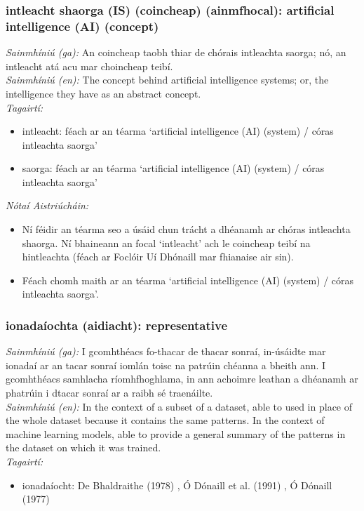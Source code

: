 \documentclass{article}
\begin{document}
\subsubsection*{intleacht shaorga (IS) (coincheap) (ainmfhocal): artificial intelligence (AI) (concept)}
 \noindent \textit{Sainmhíniú (ga):} An coincheap taobh thiar de chórais intleachta saorga; nó, an intleacht atá acu mar choincheap teibí.
\\
 \noindent \textit{Sainmhíniú (en):} The concept behind artificial intelligence systems; or, the intelligence they have as an abstract concept.
\\
 \noindent \textit{Tagairtí:}
\begin{itemize}
	\item intleacht: féach ar an téarma `artificial intelligence (AI) (system) / córas intleachta saorga'
	\item saorga: féach ar an téarma `artificial intelligence (AI) (system) / córas intleachta saorga'
\end{itemize}

 \noindent \textit{Nótaí Aistriúcháin:}
\begin{itemize}
	\item Ní féidir an téarma seo a úsáid chun trácht a dhéanamh ar chóras intleachta shaorga. Ní bhaineann an focal `intleacht' ach le coincheap teibí na hintleachta (féach ar Foclóir Uí Dhónaill mar fhianaise air sin).
	\item Féach chomh maith ar an téarma `artificial intelligence (AI) (system) / córas intleachta saorga'.
\end{itemize}


\subsubsection*{ionadaíochta (aidiacht): representative}
 \noindent \textit{Sainmhíniú (ga):} I gcomhthéacs fo-thacar de thacar sonraí, in-úsáidte mar ionadaí ar an tacar sonraí iomlán toisc na patrúin chéanna a bheith ann. I gcomhthéacs samhlacha ríomhfhoghlama, in ann achoimre leathan a dhéanamh ar phatrúin i dtacar sonraí ar a raibh sé traenáilte.
\\
 \noindent \textit{Sainmhíniú (en):} In the context of a subset of a dataset, able to used in place of the whole dataset because it contains the same patterns. In the context of machine learning models, able to provide a general summary of the patterns in the dataset on which it was trained.
\\
 \noindent \textit{Tagairtí:}
\begin{itemize}
	\item ionadaíocht: De Bhaldraithe (1978) \cite{de-bhaldraithe}, Ó Dónaill et al. (1991) \cite{focloir-beag}, Ó Dónaill (1977) \cite{odonaill}
\end{itemize}
\end{document}
